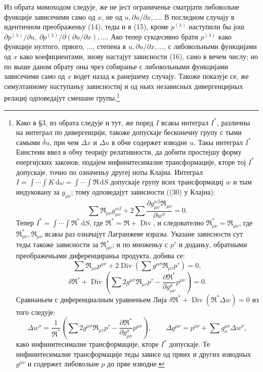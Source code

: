 ﻿\documentclass[11pt]{article}
\providecommand{\D}{\Delta}
\providecommand{\p}{\partial}
\providecommand{\dd}{\mathrm d}
\DeclareMathOperator{\Div}{Div}
\providecommand{\bd}{\bar{\delta}}
\begin{document}
Из обрата мимоходом следује, же не јест ограниченье сматрјати либовольне функције зависечими само од \(x\), не од \(u,\p u/\p x,\ldots\). В последном случају в идентичном преображеньу (14), теды и в (15), кроме \(p^{(\lambda)}\) наступили бы још \(\p p^{(\lambda)}/\p u,\ \p p^{(\lambda)}/\p(\p u/\p x),\ldots\). Ако тепер сукцесивно брати \(p^{(\lambda)}\) како функције нултого, првого, \(\ldots\), степена в \(u,\p u/\p x,\ldots\), с либовольными функцијами од \(x\) како коефициентами, знову настајут зависности (16), само в вечем числу; но по выше даном обрату оны чрез собиранье с либовольными функцијами зависечими само од \(x\) водет назад к ранејшему случају. Такоже показује се, же симултанному наступаньу зависностиј и од ньих независных дивергенцијных релациј одповедајут смешане групы.\footnote{Како в \S{}3, из обрата следује и тут, же поред \(I\) всакы интеграл \(I^*\), различны на интеграл по дивергенцији, такоже допускаје бесконечну групу с тыми самыми \(\bd u\), при чем \(\D x\) и \(\D u\) в обче содержет изводне \(u\). Такы интеграл \(I^*\) Еинстеин ввел в обчу теорију релативности, да добити простејшу форму енергијских законов; подајем инфинитесималне трансформације, кторе тој \(I^*\) допускаје, точно по означеньу другеј ноты Клајна. Интеграл \(I=\int\!\cdots\!\int K\,\dd\omega=\int\!\cdots\!\int \mathfrak{R}\,\dd S\) допускаје групу всих трансформациј \(w\) и тым индуковану за \(g_{\mu\nu}\); тому одповедајут зависности ((30) у Клајна):
\[
\sum \mathfrak{R}_{\mu\nu}g_{\mu\nu}^{\alpha\beta}
+2\sum\frac{\p g_{\mu\nu}^{\alpha\beta}\mathfrak{R}_{\mu\nu}}{\p w^\sigma}=0.
\]
Тепер \(I^*=\int\!\cdots\!\int \mathfrak{R}^*\,\dd S\), где \(\mathfrak{R}^*=\mathfrak{R}+\Div\), и следователно \(\mathfrak{R}_{\mu\nu}^*=\mathfrak{R}_{\mu\nu}\), где \(\mathfrak{R}_{\mu\nu}^*,\mathfrak{R}_{\mu\nu}\) всакы раз означајут Лагранжеве изразы. Указане зависности сут теды такоже зависности за \(\mathfrak{R}_{\mu\nu}^*\); и по множеньу с \(p^\tau\) и доданьу, обратными преображеньами диференцираньа продукта, добива се:
\[
\sum \mathfrak{R}_{\mu\nu}p^{\mu\nu}
+2\Div\!\left(\sum g^{\mu\sigma}\mathfrak{R}_{\mu\tau}p^\tau\right)=0,
\]
\[
\delta\mathfrak{R}^*+\Div\!\left(\sum 2g^{\mu\sigma}\mathfrak{R}_{\mu\tau}p^\tau
-\frac{\p\mathfrak{R}^*}{\p g_{\mu\nu}^{\sigma}}p^{\mu\nu}\right)=0.
\]
Сравнаньем с диференциалным уравненьем Лија \(\delta\mathfrak{R}^*+\Div(\mathfrak{R}^*\D w)=0\) из того следује:
\[
\D w^\sigma=\frac1{\mathfrak{R}^*}\left(\sum 2g^{\mu\sigma}\mathfrak{R}_{\mu\tau}p^\tau
-\frac{\p\mathfrak{R}^*}{\p g_{\mu\nu}^{\sigma}}p^{\mu\nu}\right),
\qquad
\D g^{\mu\nu}=p^{\mu\nu}+\sum g^{\mu\nu}_{\sigma}\D w^\sigma,
\]
како инфинитесималне трансформације, кторе \(I^*\) допускаје. Те инфинитесималне трансформације теды зависе од првих и других изводных \(g^{\mu\nu}\) и содержет либовольне \(p\) до прве изводне.}
\end{document}
